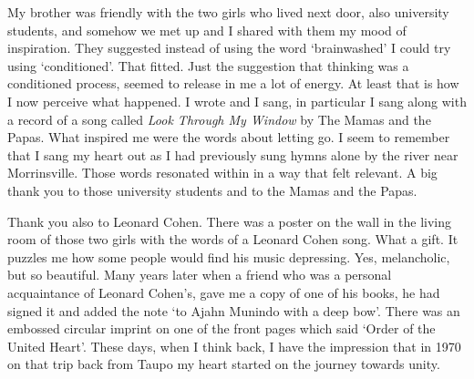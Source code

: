 My brother was friendly with the two girls who lived next door, also
university students, and somehow we met up and I shared with them my
mood of inspiration. They suggested instead of using the word
`brainwashed' I could try using `conditioned'. That fitted. Just the
suggestion that thinking was a conditioned process, seemed to release in
me a lot of energy. At least that is how I now perceive what happened. I
wrote and I sang, in particular I sang along with a record of a song
called \emph{Look Through My Window}\cite{window} by The Mamas and the Papas. What
inspired me were the words
about letting go. I seem to remember that I sang my heart out
as I had previously sung hymns alone by the river near Morrinsville. Those words
resonated within in a way that felt relevant. A big thank you
to those university students and to the Mamas and the Papas.

Thank you also to Leonard Cohen. There was a poster on the wall in the
living room of those two girls with the words of a Leonard Cohen song.
What a gift. It puzzles me how some people would find his music
depressing. Yes, melancholic, but so beautiful. Many years later when a
friend who was a personal acquaintance of Leonard Cohen's, gave me a
copy of one of his books, he had signed it and added the note `to Ajahn
Munindo with a deep bow'. There was an embossed circular imprint
on one of the front pages which said `Order of the United Heart'. These days, when I think back, I have the impression that in 1970 on that trip back from Taupo my heart started on the journey towards unity. 
